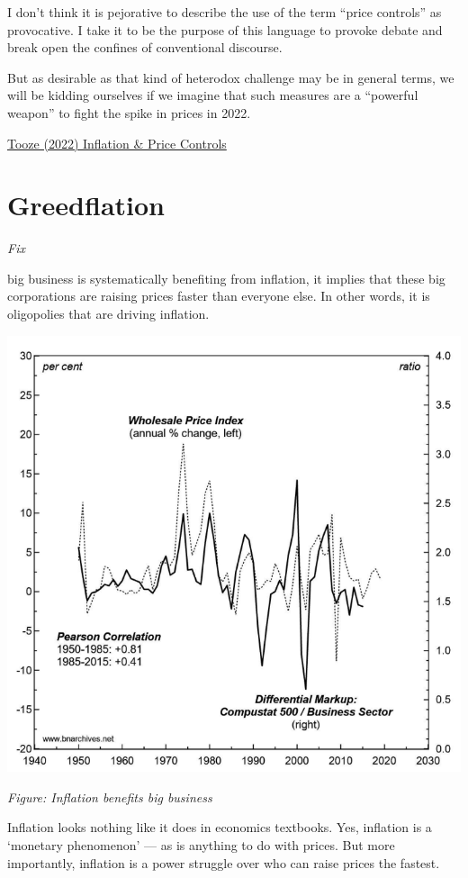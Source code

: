 \documentclass[
]{book}
\begin{document}
I don't think it is pejorative to describe the use of the term ``price controls'' as provocative. I take it to be the purpose of this language to provoke debate and break open the confines of conventional discourse.

But as desirable as that kind of heterodox challenge may be in general terms, we will be kidding ourselves if we imagine that such measures are a ``powerful weapon'' to fight the spike in prices in 2022.

\href{https://adamtooze.substack.com/p/top-links-65-inflation-and-price}{Tooze (2022) Inflation \& Price Controls}

\hypertarget{greedflation}{%
\section{Greedflation}\label{greedflation}}

\emph{Fix}

big business is systematically benefiting from inflation, it implies that these big corporations are raising prices faster than everyone else. In other words, it is oligopolies that are driving inflation.

\includegraphics{fig/bn_inflation_markup_crop.png}

\emph{Figure: Inflation benefits big business}

Inflation looks nothing like it does in economics textbooks. Yes, inflation is a `monetary phenomenon' --- as is anything to do with prices. But more importantly, inflation is a power struggle over who can raise prices the fastest.
\end{document}
